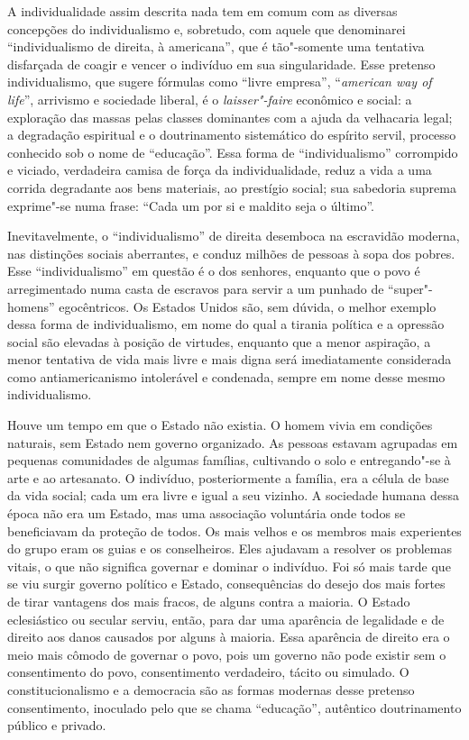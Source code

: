 A individualidade assim descrita nada tem em comum com as diversas
concepções do individualismo e, sobretudo, com aquele que denominarei
“individualismo de direita, à americana”, que é tão"-somente uma
tentativa disfarçada de coagir e vencer o indivíduo em sua
singularidade. Esse pretenso individualismo, que sugere fórmulas
como “livre empresa”, “\textit{american way of life}”, arrivismo e sociedade
liberal, é o \textit{laisser"-faire} econômico e social: a exploração das
massas pelas classes dominantes com a ajuda da velhacaria legal; a
degradação espiritual e o doutrinamento sistemático do espírito servil,
processo conhecido sob o nome de “educação”. Essa forma de
“individualismo” corrompido e viciado, verdadeira camisa de força da
individualidade, reduz a vida a uma corrida degradante aos bens
materiais, ao prestígio social; sua sabedoria suprema exprime"-se numa
frase: “Cada um por si e maldito seja o último”.

Inevitavelmente, o “individualismo” de direita desemboca na escravidão
moderna, nas distinções sociais aberrantes, e conduz milhões de pessoas à
sopa dos pobres. Esse “individualismo” em questão é o dos senhores,
enquanto que o povo é arregimentado numa casta de escravos para servir
a um punhado de “super"-homens” egocêntricos. Os Estados Unidos são,
sem dúvida, o melhor exemplo dessa forma de individualismo, em nome do
qual a tirania política e a opressão social são elevadas à posição de
virtudes, enquanto que a menor aspiração, a menor tentativa de vida mais
livre e mais digna será imediatamente considerada como
antiamericanismo intolerável e condenada, sempre em nome desse mesmo
individualismo.

Houve um tempo em que o Estado não existia. O homem vivia em condições
naturais, sem Estado nem governo organizado. As pessoas estavam
agrupadas em pequenas comunidades de algumas famílias, cultivando o
solo e entregando"-se à arte e ao artesanato. O indivíduo,
posteriormente a família, era a célula de base da vida social; cada um
era livre e igual a seu vizinho. A sociedade humana dessa época não
era um Estado, mas uma associação voluntária onde todos se beneficiavam
da proteção de todos. Os mais velhos e os membros mais experientes do
grupo eram os guias e os conselheiros. Eles ajudavam a resolver os
problemas vitais, o que não significa governar e dominar o indivíduo.
Foi só mais tarde que se viu surgir governo político e Estado,
consequências do desejo dos mais fortes de tirar vantagens dos mais
fracos, de alguns contra a maioria. O Estado eclesiástico ou secular
serviu, então, para dar uma aparência de legalidade e de direito aos
danos causados por alguns à maioria. Essa aparência de direito era o
meio mais cômodo de governar o povo, pois um governo não pode existir
sem o consentimento do povo, consentimento verdadeiro, tácito ou
simulado. O constitucionalismo e a democracia são as formas modernas
desse pretenso consentimento, inoculado pelo que se chama “educação”,
autêntico doutrinamento público e privado.

